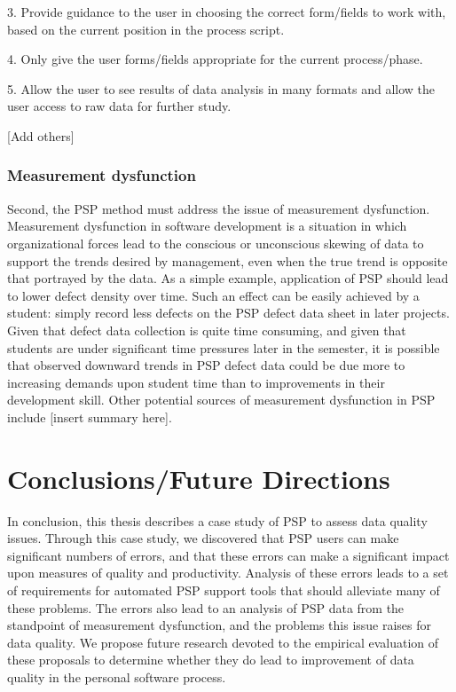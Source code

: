 3. Provide guidance to the user in choosing the correct form/fields
   to work with, based on the current position in the process script.

4. Only give the user forms/fields appropriate for the current
   process/phase.

5. Allow the user to see results of data analysis in many formats and
   allow the user access to raw data for further study.

[Add others]


\subsection{Measurement dysfunction}

Second, the PSP method must address the issue of measurement
dysfunction. Measurement dysfunction in software development
is a situation in which organizational forces lead to the
conscious or unconscious skewing of data to support the
trends desired by management, even when the true trend is
opposite that portrayed by the data.  As a simple example,
application of PSP should lead to lower defect density over
time.  Such an effect can be easily achieved by a student:
simply record less defects on the PSP defect data sheet in
later projects.  Given that defect data collection is quite
time consuming, and given that students are under
significant time pressures later in the semester, it is
possible that observed downward trends in PSP defect data
could be due more to increasing demands upon student time
than to improvements in their development skill.  Other
potential sources of measurement dysfunction in PSP include
[insert summary here].


\chapter{Conclusions/Future Directions}
In conclusion, this thesis describes a case study of PSP
to assess data quality issues. Through this case study,
we discovered that PSP users can make significant numbers
of errors, and that these errors can make
a significant impact upon measures of quality and
productivity.  Analysis of these errors leads to a
set of requirements for automated PSP support tools that
should alleviate many of these problems.  The errors also
lead to an analysis of PSP data from the standpoint of
measurement dysfunction, and the problems this issue
raises for data quality.  We propose future research
devoted to the empirical evaluation of these proposals
to determine whether they do lead to improvement of
data quality in the personal software process.






